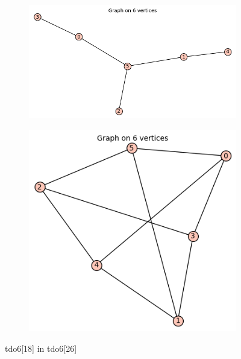 \documentclass[12pt, a4paper]{article}
\begin{document}
\begin{center}
\begin{figure}[!htb]
\centering
\begin{subfigure}{0.5\textwidth}
  \centering
  \includegraphics[width=0.8\linewidth]{tdo6[18]}
\end{subfigure}%
\begin{subfigure}{0.5\textwidth}
  \centering
  \includegraphics[width=0.5\linewidth]{tdo6[26]}
\end{subfigure}
\caption{tdo6[18] in tdo6[26]}
\label{fig:test}
\end{figure}
\clearpage


\end{center}
\end{document}
